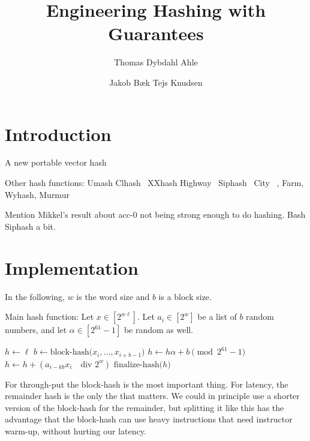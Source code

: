 

\renewcommand{\div}{\quad\text{div }}

\author{Thomas Dybdahl Ahle \and Jakob Bæk Tejs Knudsen}
\title{Engineering Hashing with Guarantees}

\maketitle

\section{Introduction}

A new portable vector hash

Other hash functions:
Umash
Clhash~\cite{lemire2016faster}
XXhash
Highway~\cite{alakuijala2016fast}
Siphash~\cite{aumasson2012siphash}
City~\cite{pike2017cityhash}
, Farm, Wyhash, Murmur~\cite{appleby2012smhasher}

Mention Mikkel's result about acc-0 not being strong enough to do hashing.
Bash Siphash a bit.

\section{Implementation}

In the following, $w$ is the word size and $b$ is a block size.
\begin{algorithm}[H]
   \caption{
      Main hash function:
      Let $x\in[2^{w\ell}]$.
      Let $a_i\in[2^w]$ be a list of $b$ random numbers,
      and let $\alpha\in[2^{61}-1]$ be random as well.
   }
   \begin{algorithmic}
      \State $h\gets \ell$
         \State $b\gets \text{block-hash($x_i,\dots,x_{i+b-1}$)}$
         \State $h\gets h\alpha + b \pmod{2^{61}-1}$
      \EndFor
         \State $h\gets h + (a_{i-kb} x_i \div 2^w)$
      \EndFor
      \State \Return $\text{finalize-hash($h$)}$
   \end{algorithmic}
\end{algorithm}

For through-put the block-hash is the most important thing.
For latency, the remainder hash is the only the that matters.
We could in principle use a shorter version of the block-hash for the remainder,
but splitting it like this has the advantage that the block-hash can use heavy instructions that need instructor warm-up, without hurting our latency.

